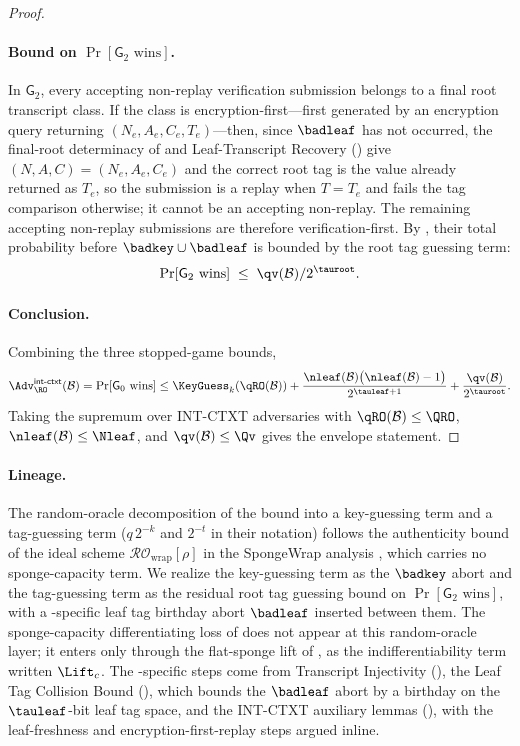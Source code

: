 \begin{proof}
\paragraph{Bound on $\Pr[\mathsf{G}_2 \text{ wins}]$.}
In $\mathsf{G}_2$, every accepting non-replay verification submission
belongs to a final root transcript class. If the class is
encryption-first---first generated by an encryption query returning
$(N_e,A_e,C_e,T_e)$---then, since $\badleaf$ has not occurred, the
final-root determinacy of  and Leaf-Transcript
Recovery () give
$(N,A,C) = (N_e,A_e,C_e)$ and the correct root tag is the value already
returned as $T_e$, so the submission is a replay when $T = T_e$ and
fails the tag comparison otherwise; it cannot be an accepting
non-replay. The remaining accepting non-replay submissions are
therefore verification-first. By
, their total probability
before $\badkey \cup
\badleaf$ is bounded by the root tag guessing
term:
\[
  \Pr[\mathsf{G}_2 \text{ wins}]
  \;\leq\; \qv(\mathcal{B}) / 2^{\tauroot}.
\]

\paragraph{Conclusion.}
Combining the three stopped-game bounds,
\[
  \Adv^{\mathsf{int\text{-}ctxt}}_\RO(\mathcal{B})
  = \Pr[\mathsf{G}_0 \text{ wins}]
  \leq
  \KeyGuess_k(\qRO(\mathcal{B}))
  + \frac{\nleaf(\mathcal{B})\bigl(\nleaf(\mathcal{B}) - 1\bigr)}{2^{\tauleaf + 1}}
  + \frac{\qv(\mathcal{B})}{2^{\tauroot}}.
\]
Taking the supremum over INT-CTXT adversaries with
$\qRO(\mathcal{B}) \leq \QRO$, $\nleaf(\mathcal{B}) \leq \Nleaf$, and
$\qv(\mathcal{B}) \leq \Qv$ gives the envelope statement.
\end{proof}

\paragraph{Lineage.}
The random-oracle decomposition of the bound into a key-guessing term
and a tag-guessing term ($q\,2^{-k}$ and $2^{-t}$ in their notation)
follows the authenticity bound of the ideal scheme
$\mathcal{RO}_{\mathrm{wrap}}[\rho]$ in the SpongeWrap analysis
\cite[Lemma~6]{BDPV11}, which carries no sponge-capacity term. We realize
the key-guessing term as the $\badkey$ abort and
the tag-guessing term as the residual root tag guessing bound on
$\Pr[\mathsf{G}_2 \text{ wins}]$, with a \TW{}-specific leaf tag
birthday abort $\badleaf$ inserted between them.
The sponge-capacity differentiating loss of
\cite[\S5, Theorem~1]{BDPV11} does not appear at this random-oracle
layer; it enters only through the flat-sponge lift of
, as the \cite{BDPV08} indifferentiability
term written $\Lift_c$. The \TW{}-specific steps come from
Transcript Injectivity (), the Leaf Tag
Collision Bound (), which bounds the
$\badleaf$ abort by a birthday on the
$\tauleaf$-bit leaf tag space, and the INT-CTXT
auxiliary lemmas
(),
with the leaf-freshness and encryption-first-replay steps argued inline.
